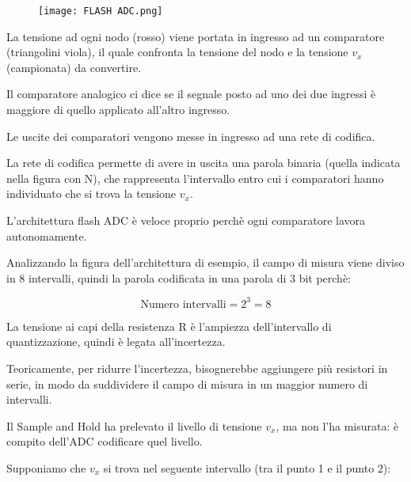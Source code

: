 \begin{figure}[h]
    \centering
    \texttt{[image: FLASH ADC.png]}
\end{figure}

La tensione ad ogni nodo (rosso) viene portata in ingresso ad un comparatore (triangolini viola), 
il quale confronta la tensione del nodo e la tensione $v_x$ (campionata) da convertire. \newline 

Il comparatore analogico ci dice se il segnale posto ad uno dei due ingressi è maggiore di quello applicato all'altro ingresso. \newline 

Le uscite dei comparatori vengono messe in ingresso ad una rete di codifica. \newline 

La rete di codifica permette di avere in uscita una parola binaria (quella indicata nella figura con N), 
che rappresenta l'intervallo entro cui i comparatori hanno individuato che si trova la tensione $v_x$. \newline 

L'architettura flash ADC è veloce proprio perchè ogni comparatore lavora autonomamente. \newline 

Analizzando la figura dell'architettura di esempio, il campo di misura viene diviso in 8 intervalli, quindi la parola codificata in una parola di 3 bit perchè: 

{
    \Large 
    \begin{equation}
        \text{Numero intervalli} = 2^{3} = 8
    \end{equation}
}

La tensione ai capi della resistenza R è l'ampiezza dell'intervallo di quantizzazione, 
quindi è legata all'incertezza. \newline 

Teoricamente, per ridurre l'incertezza, bisognerebbe aggiungere più resistori in serie, in modo da suddividere il campo di misura 
in un maggior numero di intervalli. \newline 

Il Sample and Hold ha prelevato il livello di tensione $v_x$, ma non l'ha misurata: 
è compito dell'ADC codificare quel livello. \newline 

Supponiamo che $v_x$ si trova nel seguente intervallo (tra il punto 1 e il punto 2): 

